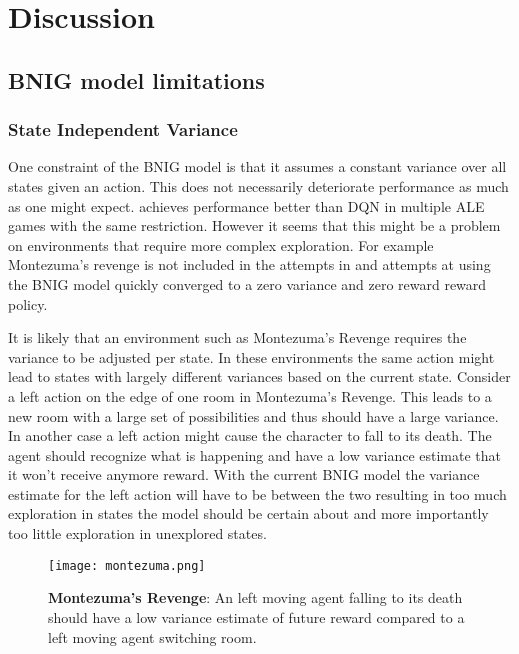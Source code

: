 \chapter{Discussion}\label{ch:disc}

\section{BNIG model limitations}

\subsection{State Independent Variance}

One constraint of the BNIG model is that it assumes a constant variance over all states given an action. This does not necessarily deteriorate performance as much as one might expect. \cite{azziz_2018} achieves performance better than DQN in multiple ALE games with the same restriction. However it seems that this might be a problem on environments that require more complex exploration. For example Montezuma's revenge is not included in the attempts in \cite{azziz_2018} and attempts at using the BNIG model quickly converged to a zero variance and zero reward reward policy.

It is likely that an environment such as Montezuma's Revenge requires the variance to be adjusted per state. In these environments the same action might lead to states with largely different variances based on the current state. Consider a left action on the edge of one room in Montezuma's Revenge. This leads to a new room with a large set of possibilities and thus should have a large variance. In another case a left action might cause the character to fall to its death. The agent should recognize what is happening and have a low variance estimate that it won't receive anymore reward. With the current BNIG model the variance estimate for the left action will have to be between the two resulting in too much exploration in states the model should be certain about and more importantly too little exploration in unexplored states.

\begin{figure}[H]
    \centering
    \texttt{[image: montezuma.png]}
    \captionsetup{width=.7\linewidth}

    \caption{\textbf{Montezuma's Revenge}: An left moving agent falling to its death should have a low variance estimate of future reward compared to a left moving agent switching room.}
\end{figure}

